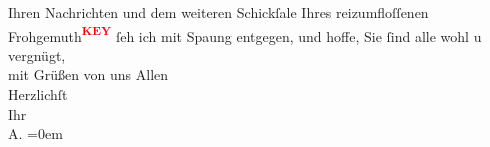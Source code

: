 \begin{ledgroupsized}[t]{13cm}
           \pstart
           Ihren Nachrichten und dem weiteren Schickſale Ihres reizumfloſſenen Frohgemuth\textcolor{red}{\textsuperscript{\textbf{KEY}}} ſeh ich mit Spa{\geminationn}ung entgegen, und hoffe, Sie ſind alle wohl u vergnügt, {\\[\baselineskip]}mit Grüßen von uns
               Allen {\\[\baselineskip]}Herzlichſt {\\[\baselineskip]}Ihr {\\[\baselineskip]}\spacefill\mbox{A.}\pend
           \leftskip=0em{}
         
         \endnumbering{}\end{ledgroupsized}\begin{anhang}\end{anhang}\newcommand{\dateiname}{L03018}\newcommand{\titel}{Arthur Schnitzler an Felix Salten, 8. 8. 1911}\newcommand{\editorInnen}{Martin Anton Müller und Laura Untner}
      